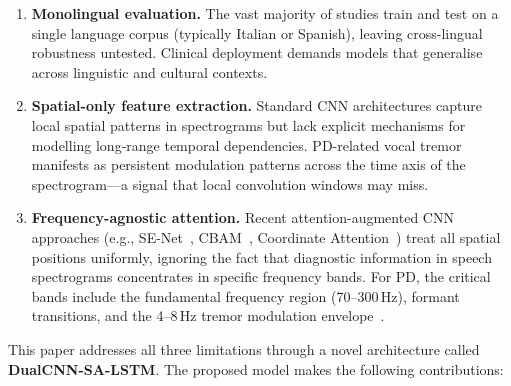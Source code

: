 \documentclass[conference]{IEEEtran}
\begin{document}
\begin{enumerate}
    \item \textbf{Monolingual evaluation.} The vast majority of studies train and test on a single language corpus (typically Italian or Spanish), leaving cross-lingual robustness untested. Clinical deployment demands models that generalise across linguistic and cultural contexts.

    \item \textbf{Spatial-only feature extraction.} Standard CNN architectures capture local spatial patterns in spectrograms but lack explicit mechanisms for modelling long-range temporal dependencies. PD-related vocal tremor manifests as persistent modulation patterns across the time axis of the spectrogram—a signal that local convolution windows may miss.

    \item \textbf{Frequency-agnostic attention.} Recent attention-augmented CNN approaches (e.g., SE-Net~\cite{hu2018}, CBAM~\cite{woo2018}, Coordinate Attention~\cite{hou2021}) treat all spatial positions uniformly, ignoring the fact that diagnostic information in speech spectrograms concentrates in specific frequency bands. For PD, the critical bands include the fundamental frequency region (70--300\,Hz), formant transitions, and the 4--8\,Hz tremor modulation envelope~\cite{rusz2011}.
\end{enumerate}

This paper addresses all three limitations through a novel architecture called \textbf{DualCNN-SA-LSTM}. The proposed model makes the following contributions:
\end{document}
